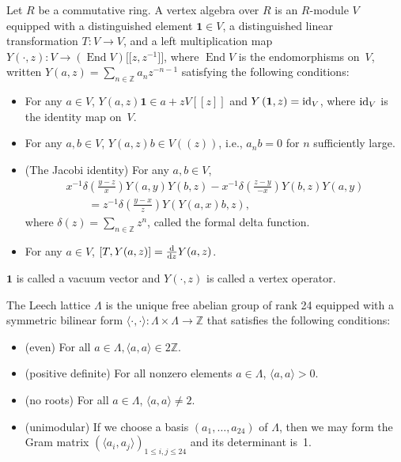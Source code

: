 \documentclass[10pt,a4paper]{amsart}
\numberwithin{equation}{section}
\begin{document}
\begin{Definition}[\cite{C}]
Let $R$ be a commutative ring. A vertex algebra over $R$ is an $R$-module $V$ equipped with a distinguished element $\mathbf{1}\in V$, a distinguished linear transformation $T\colon V\rightarrow V$, and a left multiplication map
$Y(\cdot,z)\colon V\rightarrow(\operatorname{End} V)\big[\big[z,z^{-1}\big]\big]$, where $\operatorname{End} V$ is the endomorphisms on~$V$, written $Y(a,z)=\sum_{n\in\mathbb{Z}} a_nz^{-n-1}$ satisfying the following conditions:
 \begin{itemize}\itemsep=0pt
 \item For any $a \in V$, $Y(a,z)\mathbf{1}\in a+zV[[z]]$ and $Y\left(\mathbf{1},z\right)={\rm id}_V$, where ${\rm id}_V$ is the identity map on~$V$.
 \item For any $a,b \in V$, $Y(a,z)b\in V((z))$, i.e., $a_nb=0$ for $n$ sufficiently large.
 \item (The Jacobi identity) For any $a,b \in V$,
 \begin{gather*}
x^{-1}\delta \left( \frac{y-z}{x}\right) Y(a,y)Y(b,z)-x^{-1}\delta \left(\frac{z-y}{-x}\right)Y(b,z)Y(a,y)\\
\qquad{} =z^{-1}\delta \left(\frac{y-x}{z}\right)Y(Y(a,x)b,z),
 \end{gather*}
where $\delta (z)=\sum_{n\in \mathbb{Z}}z^n$, called the formal delta function.
 \item For any $a \in V$, $[T,Y(a,z)]=\frac{{\rm d}}{{\rm d}z}Y(a,z)$.
 \end{itemize}
$\mathbf{1}$ is called a vacuum vector and $Y(\cdot,z)$ is called a vertex operator.
\end{Definition}

\begin{Definition}
The Leech lattice $\Lambda$ is the unique free abelian group of rank 24 equipped with a symmetric bilinear form $\langle \cdot ,\cdot \rangle\colon \Lambda \times \Lambda \rightarrow \mathbb{Z}$ that satisfies the following conditions:
 \begin{itemize}\itemsep=0pt
 \item (even) For all $a \in \Lambda, \langle a,a \rangle \in 2\mathbb{Z}$.
 \item (positive definite) For all nonzero elements $a \in \Lambda$, $\langle a,a \rangle > 0$.
 \item (no roots) For all $a \in \Lambda$, $\langle a,a \rangle \neq 2$.
 \item (unimodular) If we choose a basis $(a_1,\dots,a_{24})$ of $\Lambda$, then we may form the Gram matrix $(\langle a_i,a_j \rangle)_{1\leq i,j\leq 24}$ and its determinant is~1.
 \end{itemize}
\end{Definition}
\end{document}
